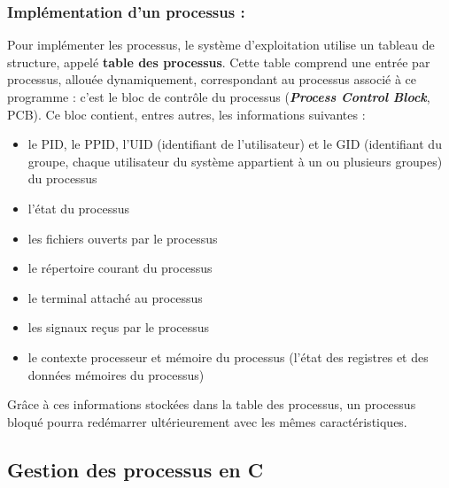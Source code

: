 		\subsubsection*{Implémentation d'un processus :}
			Pour implémenter les processus, le système d'exploitation utilise un tableau de structure, appelé \textbf{table des processus}. Cette table comprend une entrée par processus, allouée dynamiquement, correspondant au processus associé à ce programme : c'est le bloc de contrôle du processus (\textbf{\textit{Process Control Block}}, PCB). Ce bloc contient, entres autres, les informations suivantes :
			\begin{itemize}
				\item le PID, le PPID, l'UID (identifiant de l'utilisateur) et le GID (identifiant du groupe, chaque utilisateur du système appartient à un ou plusieurs groupes) du processus
				\item l'état du processus
				\item les fichiers ouverts par le processus
				\item le répertoire courant du processus
				\item le terminal attaché au processus
				\item les signaux reçus par le processus
				\item le contexte processeur et mémoire du processus (l'état des registres et des données mémoires du processus)
			\end{itemize}
			Grâce à ces informations stockées dans la table des processus, un processus bloqué pourra redémarrer ultérieurement avec les mêmes caractéristiques.
			
			
	\subsection{Gestion des processus en C}
